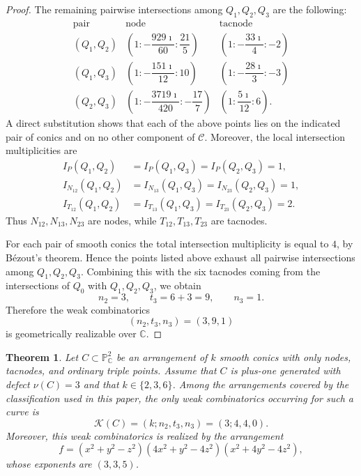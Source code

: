 \documentclass[11pt]{article}
\theoremstyle{plain}
\newtheorem{thm}{Theorem}[section]
\theoremstyle{definition}
\begin{document}
\begin{proof}
The remaining pairwise intersections among \(Q_1,Q_2,Q_3\) are the following:
\[
\renewcommand{\arraystretch}{1.4}
\begin{array}{c|c|c}
\text{pair} & \text{node} & \text{tacnode}\\
\hline
(Q_1,Q_2)
&
\left(1:-\dfrac{929\imath}{60}:\dfrac{21}{5}\right)
&
\left(1:-\dfrac{33\imath}{4}:-2\right)
\\
(Q_1,Q_3)
&
\left(1:-\dfrac{151\imath}{12}:10\right)
&
\left(1:-\dfrac{28\imath}{3}:-3\right)
\\
(Q_2,Q_3)
&
\left(1:-\dfrac{3719\imath}{420}:-\dfrac{17}{7}\right)
&
\left(1:\dfrac{5\imath}{12}:6\right).
\end{array}
\]
A direct substitution shows that each of the above points lies on the indicated
pair of conics and on no other component of \(\mathcal C\). Moreover, the local
intersection multiplicities are
\[
\begin{aligned}
I_P(Q_1,Q_2)&=I_P(Q_1,Q_3)=I_P(Q_2,Q_3)=1,\\
I_{N_{12}}(Q_1,Q_2)&=I_{N_{13}}(Q_1,Q_3)=I_{N_{23}}(Q_2,Q_3)=1,\\
I_{T_{12}}(Q_1,Q_2)&=I_{T_{13}}(Q_1,Q_3)=I_{T_{23}}(Q_2,Q_3)=2.
\end{aligned}
\]
Thus \(N_{12},N_{13},N_{23}\) are nodes, while
\(T_{12},T_{13},T_{23}\) are tacnodes.

For each pair of smooth conics the total intersection multiplicity is equal to
\(4\), by B\'ezout's theorem. Hence the points listed above exhaust all pairwise
intersections among \(Q_1,Q_2,Q_3\). Combining this with the six tacnodes
coming from the intersections of \(Q_0\) with \(Q_1,Q_2,Q_3\), we obtain
\[
        n_2=3,\qquad t_3=6+3=9,\qquad n_3=1.
\]
Therefore the weak combinatorics
\[
        (n_2,t_3,n_3)=(3,9,1)
\]
is geometrically realizable over \(\mathbb C\).
\end{proof}



\begin{thm}
Let $C\subset\mathbb P^2_{\mathbb C}$ be an arrangement of $k$ smooth conics with only nodes, tacnodes, and ordinary triple points. Assume that $C$ is plus-one generated with defect $\nu(C)=3$ and that $k\in\{2,3,6\}$. Among the arrangements covered by the classification used in this paper, the only weak combinatorics occurring for such a curve is
\[
\mathcal K(C)=(k;n_2,t_3,n_3)=(3;4,4,0).
\]
Moreover, this weak combinatorics is realized by the arrangement
\[
f=(x^2+y^2-z^2)(4x^2+y^2-4z^2)(x^2+4y^2-4z^2),
\]
whose exponents are $(3,3,5)$.
\end{thm}
\end{document}
